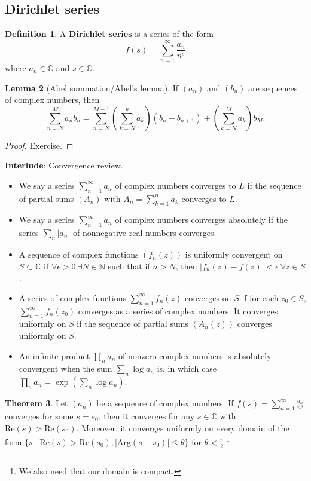 \documentclass{article}
\theoremstyle{definition}
\newtheorem{theorem}{Theorem}[section]
\newtheorem{lemma}[theorem]{Lemma}
\newtheorem{defn}[theorem]{Definition}
\begin{document}
\subsection{Dirichlet series}
\begin{defn}\label{defn2.1}
    A \textbf{Dirichlet series} is a series of the form \[
    f(s) = \sum_{n=1}^{\infty} \frac{a_n}{n^s}
    \]
    where $a_n \in \mathbb{C}$ and $s \in \mathbb{C}$.
\end{defn}
\begin{lemma}[Abel summation/Abel's lemma]\label{lemma2.2}
    If $(a_n)$ and $(b_n)$ are sequences of complex numbers, then \[
    \sum_{n=N}^{M} a_nb_n = \sum_{n=N}^{M-1} \left(\sum_{k=N}^{n} a_k\right)(b_n-b_{n+1}) + \left(\sum_{k=N}^{M} a_k \right)b_M. 
    \]
\end{lemma}
\begin{proof}
    Exercise.
\end{proof}
\textbf{Interlude}: Convergence review.
\begin{itemize}
    \item We say a series $\sum_{n=1}^{\infty} a_n$ of complex numbers converges to $L$ if the sequence of partial sums $(A_n)$ with $A_n = \sum_{k=1}^{n} a_k$ converges to $L$.
    \item We say a series $\sum_{n=1}^{\infty} a_n$ of complex numbers converges absolutely if the series $\sum_{n}^{} \left|a_n\right|$ of nonnegative real numbers converges.
    \item A sequence of complex functions $(f_n(z))$ is uniformly convergent on $S \subset \mathbb{C}$ if $\forall \epsilon>0 ~ \exists N \in \mathbb{N}$ such that if $n>N$, then $\left|f_n(z) - f(z)\right|<\epsilon ~\forall z \in S$. 
    \item A series of complex functions $\sum_{n=1}^{\infty} f_n(z)$ converges on $S$ if for each $z_0 \in S$, $\sum_{n=1}^{\infty} f_n(z_0)$ converges as a series of complex numbers. It converges uniformly on $S$ if the sequence of partial sums $(A_n(z))$ converges uniformly on $S$.
    \item An infinite product $\prod_{n}^{} a_n$ of nonzero complex numbers is absolutely convergent when the sum $\sum_{n}^{} \log a_n$ is, in which case $\prod_{n}^{} a_n = \exp (\sum_{n}^{} \log a_n)$.
\end{itemize}
\begin{theorem}\label{theorem2.3}
    Let $(a_n)$ be a sequence of complex numbers. If $f(s) = \sum_{n=1}^{\infty} \frac{a_n}{n^s}$ converges for some $s=s_0$, then it converges for any $s \in \mathbb{C}$ with $\text{Re}(s)>\text{Re}(s_0)$. Moreover, it converges uniformly on every domain of the form $\{s \mid \text{Re}(s)>\text{Re}(s_0), \left|\text{Arg}(s-s_0)\right|\le \theta\}$ for $\theta < \frac{\pi}{2}$.\footnote{We also need that our domain is compact.}
\end{theorem}
\end{document}
